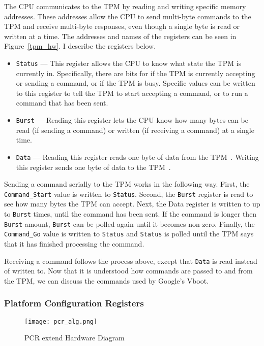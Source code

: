 \documentclass[../report.tex]{subfiles}
\def\code#1{\texttt{#1}}
\begin{document}
The CPU communicates to the TPM by reading and writing specific memory addresses.
These addresses allow the CPU to send multi-byte commands to the TPM and receive multi-byte responses, even though a single byte is read or written at a time.
The addresses and names of the registers can be seen in Figure~\ref{tpm_hw}.
I describe the registers below.

\begin{itemize}
    \item \code{Status} --- This register allows the CPU to know what state the TPM is currently in. Specifically, there are bits for  if the TPM is currently accepting or sending a command, or if the TPM is busy. Specific values can be written to this register to tell the TPM to start accepting a command, or to run a command that has been sent.
    \item \code{Burst} --- Reading this register lets the CPU know how many bytes can be read (if sending a command) or written (if receiving a command) at a single time.
    \item \code{Data} --- Reading this register reads one byte of data from the TPM~. Writing this register sends one byte of data to the TPM~.
\end{itemize}

Sending a command serially to the TPM works in the following way.
First, the \code{Command\_Start} value is written to \code{Status}.
Second, the \code{Burst} register is read to see how many bytes the TPM can accept.
Next, the Data register is written to up to \code{Burst} times, until the command has been sent.
If the command is longer then \code{Burst} amount, \code{Burst} can be polled again until it becomes non-zero.
Finally, the \code{Command\_Go} value is written to \code{Status} and \code{Status} is polled until the TPM says that it has finished processing the command.

Receiving a command follows the process above, except that \code{Data} is read instead of written to.
Now that it is understood how commands are passed to and from the TPM, we can discuss the commands used by Google's Vboot.

\subsubsection{Platform Configuration Registers}

\begin{figure}
  \centering
  \texttt{[image: pcr\_alg.png]}
  \caption{PCR extend Hardware Diagram}
  \label{fig:pcr_alg}
\end{figure}
\end{document}
